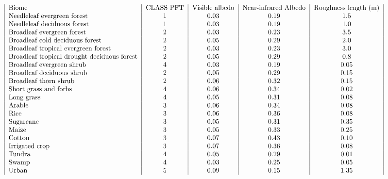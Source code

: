 \[ \begin{tabular}{ | l | c | c | c | c | c | c | c | c | } Biome & CLASS PFT & Visible albedo & Near-infrared Albedo & Roughness length (m) \\ Needleleaf evergreen forest & 1 & 0.03 & 0.19 & 1.5 \\ Needleleaf deciduous forest & 1 & 0.03 & 0.19 & 1.0 \\ Broadleaf evergreen forest & 2 & 0.03 & 0.23 & 3.5 \\ Broadleaf cold deciduous forest & 2 & 0.05 & 0.29 & 2.0 \\ Broadleaf tropical evergreen forest & 2 & 0.03 & 0.23 & 3.0 \\ Broadleaf tropical drought deciduous forest & 2 & 0.05 & 0.29 & 0.8 \\ Broadleaf evergreen shrub & 4 & 0.03 & 0.19 & 0.05 \\ Broadleaf deciduous shrub & 2 & 0.05 & 0.29 & 0.15 \\ Broadleaf thorn shrub & 2 & 0.06 & 0.32 & 0.15 \\ Short grass and forbs & 4 & 0.06 & 0.34 & 0.02 \\ Long grass & 4 & 0.05 & 0.31 & 0.08 \\ Arable & 3 & 0.06 & 0.34 & 0.08 \\ Rice & 3 & 0.06 & 0.36 & 0.08 \\ Sugarcane & 3 & 0.05 & 0.31 & 0.35 \\ Maize & 3 & 0.05 & 0.33 & 0.25 \\ Cotton & 3 & 0.07 & 0.43 & 0.10 \\ Irrigated crop & 3 & 0.07 & 0.36 & 0.08 \\ Tundra & 4 & 0.05 & 0.29 & 0.01 \\ Swamp & 4 & 0.03 & 0.25 & 0.05 \\ Urban & 5 & 0.09 & 0.15 & 1.35 \\ \end{tabular} \]

